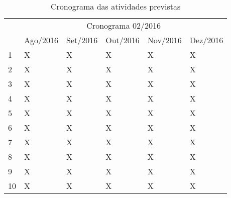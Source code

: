 \begin{table}[!htpb]
	\centering

	\begin{small} 
	  
		\setlength{\tabcolsep}{3pt} 


		\begin{tabular}{|p{5cm}|p{2cm}|p{2cm}|p{2cm}|p{2cm}|p{2cm}|}\hline
		 & \multicolumn{5}{c|}{Cronograma 02/2016}\\ \cline{2-6}
		\raisebox{1.5ex}{Entrevistas} & Ago/2016 & Set/2016 & Out/2016 & Nov/2016 & Dez/2016 \\ \hline

		1 & X & X & X & X & X \\ \hline
		2 & X & X & X & X & X \\ \hline
		3 & X & X & X & X & X \\ \hline
		4 & X & X & X & X & X \\ \hline
		5 & X & X & X & X & X \\ \hline
		6 & X & X & X & X & X \\ \hline
		7 & X & X & X & X & X \\ \hline
		8 & X & X & X & X & X \\ \hline
		9 & X & X & X & X & X \\ \hline
		10 & X & X & X & X & X \\ \hline


		\end{tabular} 
	\end{small}
	\caption{Cronograma das atividades previstas}
	\label{t_cronograma}
\end{table} 

